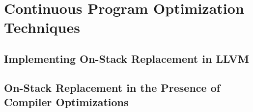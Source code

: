 \chapter{Continuous Program Optimization Techniques}
\label{ch:continuous}

\section{Implementing On-Stack Replacement in LLVM}

\section{On-Stack Replacement in the Presence of Compiler Optimizations}